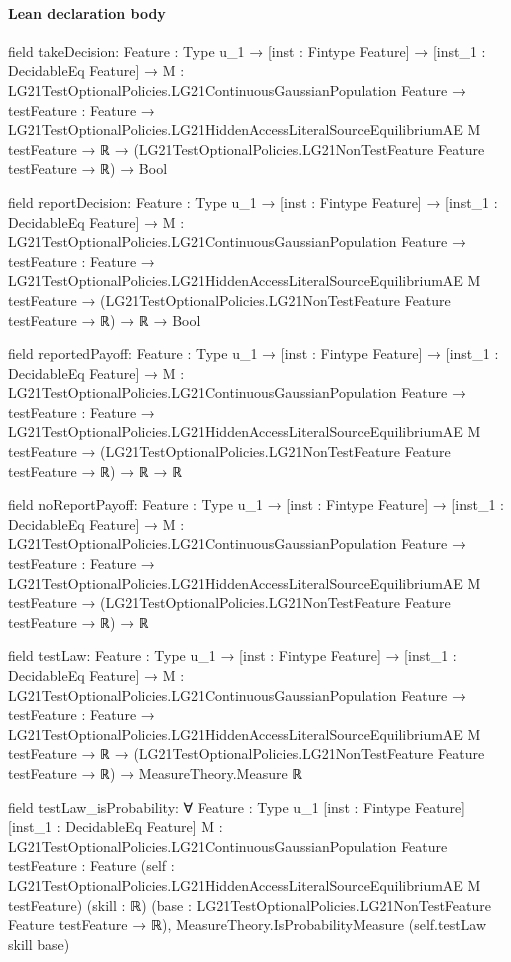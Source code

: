 \documentclass[10pt]{article}
\begin{document}
\paragraph{Lean declaration body}
\begin{ReviewVerbatim}
field takeDecision:
{Feature : Type u_1} →
  [inst : Fintype Feature] →
    [inst_1 : DecidableEq Feature] →
      {M : LG21TestOptionalPolicies.LG21ContinuousGaussianPopulation Feature} →
        {testFeature : Feature} →
          LG21TestOptionalPolicies.LG21HiddenAccessLiteralSourceEquilibriumAE M testFeature →
            ℝ → (LG21TestOptionalPolicies.LG21NonTestFeature Feature testFeature → ℝ) → Bool

field reportDecision:
{Feature : Type u_1} →
  [inst : Fintype Feature] →
    [inst_1 : DecidableEq Feature] →
      {M : LG21TestOptionalPolicies.LG21ContinuousGaussianPopulation Feature} →
        {testFeature : Feature} →
          LG21TestOptionalPolicies.LG21HiddenAccessLiteralSourceEquilibriumAE M testFeature →
            (LG21TestOptionalPolicies.LG21NonTestFeature Feature testFeature → ℝ) → ℝ → Bool

field reportedPayoff:
{Feature : Type u_1} →
  [inst : Fintype Feature] →
    [inst_1 : DecidableEq Feature] →
      {M : LG21TestOptionalPolicies.LG21ContinuousGaussianPopulation Feature} →
        {testFeature : Feature} →
          LG21TestOptionalPolicies.LG21HiddenAccessLiteralSourceEquilibriumAE M testFeature →
            (LG21TestOptionalPolicies.LG21NonTestFeature Feature testFeature → ℝ) → ℝ → ℝ

field noReportPayoff:
{Feature : Type u_1} →
  [inst : Fintype Feature] →
    [inst_1 : DecidableEq Feature] →
      {M : LG21TestOptionalPolicies.LG21ContinuousGaussianPopulation Feature} →
        {testFeature : Feature} →
          LG21TestOptionalPolicies.LG21HiddenAccessLiteralSourceEquilibriumAE M testFeature →
            (LG21TestOptionalPolicies.LG21NonTestFeature Feature testFeature → ℝ) → ℝ

field testLaw:
{Feature : Type u_1} →
  [inst : Fintype Feature] →
    [inst_1 : DecidableEq Feature] →
      {M : LG21TestOptionalPolicies.LG21ContinuousGaussianPopulation Feature} →
        {testFeature : Feature} →
          LG21TestOptionalPolicies.LG21HiddenAccessLiteralSourceEquilibriumAE M testFeature →
            ℝ → (LG21TestOptionalPolicies.LG21NonTestFeature Feature testFeature → ℝ) → MeasureTheory.Measure ℝ

field testLaw_isProbability:
∀ {Feature : Type u_1} [inst : Fintype Feature] [inst_1 : DecidableEq Feature]
  {M : LG21TestOptionalPolicies.LG21ContinuousGaussianPopulation Feature} {testFeature : Feature}
  (self : LG21TestOptionalPolicies.LG21HiddenAccessLiteralSourceEquilibriumAE M testFeature) (skill : ℝ)
  (base : LG21TestOptionalPolicies.LG21NonTestFeature Feature testFeature → ℝ),
  MeasureTheory.IsProbabilityMeasure (self.testLaw skill base)


\end{ReviewVerbatim}
\end{document}
